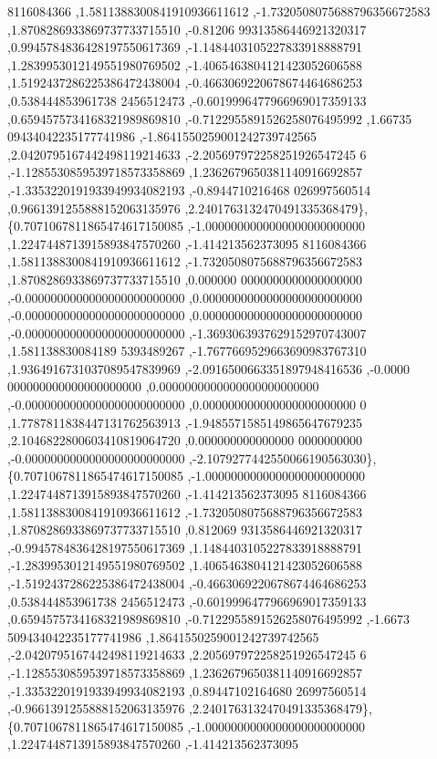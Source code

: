 \begin{DoxyCode}
      8116084366 ,1.5811388300841910936611612 ,-1.7320508075688796356672583 ,1.8708286933869737733715510 ,-0.81206
      99313586446921320317 ,0.9945784836428197550617369 ,-1.1484403105227833918888791 ,1.2839953012149551980769502
       ,-1.4065463804121423052606588 ,1.5192437286225386472438004 ,-0.4663069220678674464686253 ,0.538444853961738
      2456512473 ,-0.6019996477966969017359133 ,0.6594575734168321989869810 ,-0.7122955891526258076495992 ,1.66735
      09434042235177741986 ,-1.8641550259001242739742565 ,2.0420795167442498119214633 ,-2.205697972258251926547245
      6 ,-1.1285530859539718573358869 ,1.2362679650381140916692857 ,-1.3353220191933949934082193 ,-0.8944710216468
      026997560514 ,0.9661391255888152063135976 ,2.2401763132470491335368479\},
\{0.7071067811865474617150085 ,-1.0000000000000000000000000 ,1.2247448713915893847570260 ,-1.414213562373095
      8116084366 ,1.5811388300841910936611612 ,-1.7320508075688796356672583 ,1.8708286933869737733715510 ,0.000000
      0000000000000000000 ,-0.0000000000000000000000000 ,0.0000000000000000000000000 ,-0.0000000000000000000000000
       ,0.0000000000000000000000000 ,-0.0000000000000000000000000 ,-1.3693063937629152970743007 ,1.581138830084189
      5393489267 ,-1.7677669529663690983767310 ,1.9364916731037089547839969 ,-2.0916500663351897948416536 ,-0.0000
      000000000000000000000 ,0.0000000000000000000000000 ,-0.0000000000000000000000000 ,0.000000000000000000000000
      0 ,1.7787811838447131762563913 ,-1.9485571585149865647679235 ,2.1046822800603410819064720 ,0.000000000000000
      0000000000 ,-0.0000000000000000000000000 ,-2.1079277442550066190563030\},
\{0.7071067811865474617150085 ,-1.0000000000000000000000000 ,1.2247448713915893847570260 ,-1.414213562373095
      8116084366 ,1.5811388300841910936611612 ,-1.7320508075688796356672583 ,1.8708286933869737733715510 ,0.812069
      9313586446921320317 ,-0.9945784836428197550617369 ,1.1484403105227833918888791 ,-1.2839953012149551980769502
       ,1.4065463804121423052606588 ,-1.5192437286225386472438004 ,-0.4663069220678674464686253 ,0.538444853961738
      2456512473 ,-0.6019996477966969017359133 ,0.6594575734168321989869810 ,-0.7122955891526258076495992 ,-1.6673
      509434042235177741986 ,1.8641550259001242739742565 ,-2.0420795167442498119214633 ,2.205697972258251926547245
      6 ,-1.1285530859539718573358869 ,1.2362679650381140916692857 ,-1.3353220191933949934082193 ,0.89447102164680
      26997560514 ,-0.9661391255888152063135976 ,2.2401763132470491335368479\},
\{0.7071067811865474617150085 ,-1.0000000000000000000000000 ,1.2247448713915893847570260 ,-1.414213562373095

\end{DoxyCode}
